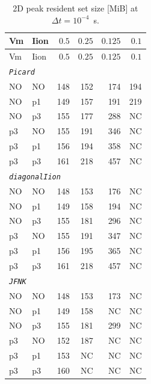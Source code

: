 \documentclass[11pt,a4paper]{article}
\newcommand{\code}[1]{\texttt{\small #1}}
\begin{document}
\begin{center}\footnotesize
\begin{longtable}{llrrrr}
\caption{2D peak resident set size [MiB] at $\Delta t = 10^{-4}$~s.}\\
\toprule
Vm & Iion & $0.5$ & $0.25$ & $0.125$ & $0.1$ \\
\midrule\endfirsthead\toprule
Vm & Iion & $0.5$ & $0.25$ & $0.125$ & $0.1$ \\
\midrule\endhead
\multicolumn{6}{l}{\textit{\code{Picard}}}\\
NO & NO & 148 & 152 & 174 & 194 \\
NO & p1 & 149 & 157 & 191 & 219 \\
NO & p3 & 155 & 177 & 288 & NC  \\
p3 & NO & 155 & 191 & 346 & NC  \\
p3 & p1 & 156 & 194 & 358 & NC  \\
p3 & p3 & 161 & 218 & 457 & NC  \\\hline
\multicolumn{6}{l}{\textit{\code{diagonalIion}}}\\
NO & NO & 148 & 153 & 176 & NC  \\
NO & p1 & 149 & 158 & 194 & NC  \\
NO & p3 & 155 & 181 & 296 & NC  \\
p3 & NO & 155 & 191 & 347 & NC  \\
p3 & p1 & 156 & 195 & 365 & NC  \\
p3 & p3 & 161 & 218 & 457 & NC  \\\hline
\multicolumn{6}{l}{\textit{\code{JFNK}}}\\
NO & NO & 148 & 153 & 173 & NC  \\
NO & p1 & 149 & 158 & NC  & NC  \\
NO & p3 & 155 & 181 & 299 & NC  \\
p3 & NO & 152 & 187 & NC  & NC  \\
p3 & p1 & 153 & NC  & NC  & NC  \\
p3 & p3 & 160 & NC  & NC  & NC  \\
\bottomrule\end{longtable}\end{center}
\end{document}
